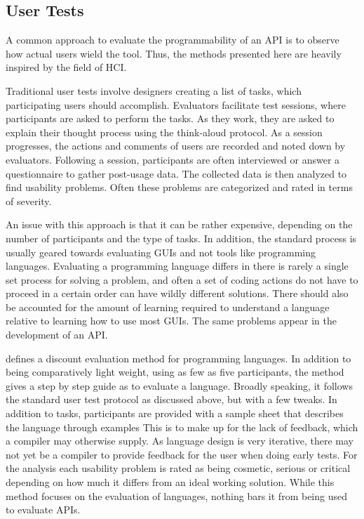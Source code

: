 \subsection{User Tests}
A common approach to evaluate the programmability of an \gls{API} is to observe how actual users wield the tool.
Thus, the methods presented here are heavily inspired by the field of \gls{HCI}.

Traditional user tests involve designers creating a list of tasks, which participating users should accomplish.
Evaluators facilitate test sessions, where participants are asked to perform the tasks.
As they work, they are asked to explain their thought process using the think-aloud protocol.
As a session progresses, the actions and comments of users are recorded and noted down by evaluators.
Following a session, participants are often interviewed or answer a questionnaire to gather post-usage data.
The collected data is then analyzed to find usability problems.
Often these problems are categorized and rated in terms of severity.

An issue with this approach is that it can be rather expensive, depending on the number of participants and the type of tasks.
In addition, the standard process is usually geared towards evaluating \glspl{GUI} and not tools like programming languages.
Evaluating a programming language differs in there is rarely a single set process for solving a problem, and often a set of coding actions do not have to proceed in a certain order  can have wildly different solutions\cite{beaton2008usability}.
There should also be accounted for the amount of learning required to understand a language relative to learning how to use most \glspl{GUI}.
The same problems appear in the development of an \gls{API}.

\citet{kurtev2016discount} defines a discount evaluation method for programming languages.
In addition to being comparatively light weight, using as few as five participants, the method gives a step by step guide as to evaluate a language.
Broadly speaking, it follows the standard user test protocol as discussed above, but with a few tweaks.
In addition to tasks, participants are provided with a sample sheet that describes the language through examples
This is to make up for the lack of feedback, which a compiler may otherwise supply.
As language design is very iterative, there may not yet be a compiler to provide feedback for the user when doing early tests.
For the analysis each usability problem is rated as being cosmetic, serious or critical depending on how much it differs from an ideal working solution.
While this method focuses on the evaluation of languages, nothing bars it from being used to evaluate \glspl{API}. 

